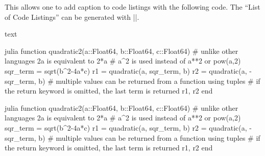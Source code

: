 \documentclass[letterpaper, 11pt, DIV=11]{scrartcl}
\newenvironment{mylisting}{\medskip\captionsetup{type=listing, labelsep=colon}}{\medskip}
\begin{document}
This allows one to add caption to code listings with the following code. The ``List of Code Listings'' can be generated with \texinline|\listoflstcaps|.

\begin{tcbsrccode}{text}
\begin{mylisting}
\begin{tcbcode*}{julia}
function quadratic2(a::Float64, b::Float64, c::Float64)
    # unlike other languages 2a is equivalent to 2*a
    # a^2 is used instead of a**2 or pow(a,2)
    sqr_term = sqrt(b^2-4a*c)
    r1 = quadratic(a, sqr_term, b)
    r2 = quadratic(a, -sqr_term, b)
    # multiple values can be returned from a function using tuples
    # if the return keyword is omitted, the last term is returned
    r1, r2
end
\end{tcbcode*}
\end{mylisting}
\listoflstcaps
\end{tcbsrccode}

\begin{mylisting}
\begin{tcbcode*}{julia}
function quadratic2(a::Float64, b::Float64, c::Float64)
    # unlike other languages 2a is equivalent to 2*a
    # a^2 is used instead of a**2 or pow(a,2)
    sqr_term = sqrt(b^2-4a*c)
    r1 = quadratic(a, sqr_term, b)
    r2 = quadratic(a, -sqr_term, b)
    # multiple values can be returned from a function using tuples
    # if the return keyword is omitted, the last term is returned
    r1, r2
end
\end{tcbcode*}
\end{mylisting}
\listoflstcaps
\end{document}
